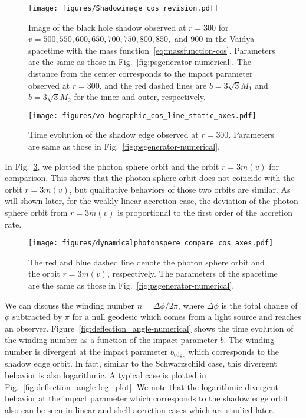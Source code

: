 \documentclass[prd,showpacs,preprintnumbers,groupedaddress,superscriptaddress,nofootinbib,11pt]{revtex4-1} %
\theoremstyle{newplain}
\begin{document}
\begin{figure}[h]%
\texttt{[image: figures/Shadowimage\_cos\_revision.pdf]}
\caption{\label{fig:shadowimage-numerical} 
Image of the black hole shadow observed at $r=300$ for $v=500, 550, 600, 650, 700, 750, 800, 850,$ and $900$ in the Vaidya spacetime with the mass function~\eqref{eq:massfunction-cos}. 
Parameters are the same as those in Fig.~\ref{fig:psgenerator-numerical}.
The distance from the center corresponds to the impact parameter observed at $r=300$, and the red dashed lines are $b=3 \sqrt{3} M_1$ and $b=3 \sqrt{3}M_2$ for the inner and outer, respectively.
}
\end{figure}

\begin{figure}[h]
\texttt{[image: figures/vo-bographic\_cos\_line\_static\_axes.pdf]}
\caption{\label{fig:vo-bo_graph-cos} 
Time evolution of the shadow edge observed at $r=300$. 
Parameters are same as those in Fig.~\ref{fig:psgenerator-numerical}.
}
\end{figure}



In Fig.~\ref{fig:psgenerator-numerical2},
we plotted the photon sphere orbit and the orbit $r = 3 m(v)$ for comparison.
This shows that
the photon sphere orbit does not coincide with the orbit $r = 3 m(v)$, 
but qualitative behaviors of those two orbits are similar.
As will shown later, for the weakly linear accretion case, the 
deviation of the photon sphere orbit from $r = 3 m(v)$ is 
proportional to the first order of the accretion rate.
\begin{figure}[h]%
\texttt{[image: figures/dynamicalphotonspere\_compare\_cos\_axes.pdf]}
\caption{\label{fig:psgenerator-numerical2} 
The red and blue dashed line denote the photon sphere orbit and the orbit $r=3m(v)$, respectively. 
The parameters of the spacetime are the same as those in Fig.~\ref{fig:psgenerator-numerical}.
}
\end{figure}
\par
We can discuss the winding number $n=\Delta \phi / 2\pi$, 
where $\Delta \phi$ is the total change of $\phi$ subtracted by $\pi$ for a null geodesic which comes from a light source and reaches an observer.
Figure~\ref{fig:deflection_angle-numerical} 
shows the time evolution of the winding number as a function of the impact parameter $b$.
The winding number is divergent at 
the impact parameter $b_{\text{edge}}$ which corresponds to the shadow edge orbit.
In fact, 
similar to the Schwarzschild case, this divergent behavior is also logarithmic.
A typical case is plotted in Fig.~\ref{fig:deflection_angle-log_plot}.
We note that the logarithmic divergent behavior
at the impact parameter which corresponds to the shadow edge orbit 
also can be seen in linear and shell accretion cases which are studied later.
\end{document}
